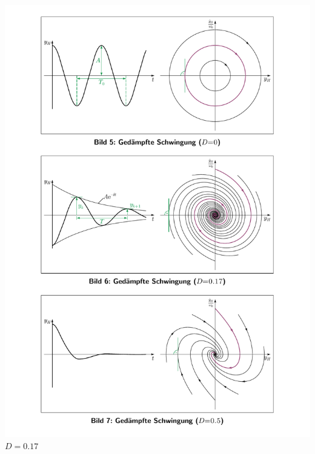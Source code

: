 \documentclass[9pt,fleqn,ngerman,article]{memoir}
\begin{document}
\begin{multicols*}{3}
					\begin{center}
						\includegraphics[width=\columnwidth]{grafiken/daempfung_d_0_1_1}
						$D = 0.17$

\end{center}
\end{multicols*}
\end{document}
